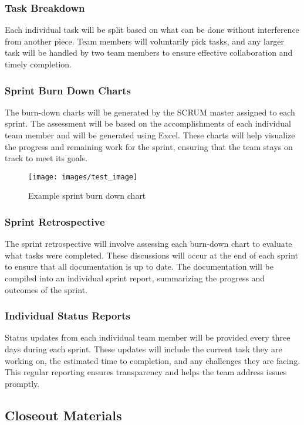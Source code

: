 \subsubsection{Task Breakdown}
Each individual task will be split based on what can be done without interference from another piece. Team members will voluntarily pick tasks, and any larger task will be handled by two team members to ensure effective collaboration and timely completion.

\subsubsection{Sprint Burn Down Charts}
The burn-down charts will be generated by the SCRUM master assigned to each sprint. The assessment will be based on the accomplishments of each individual team member and will be generated using Excel. These charts will help visualize the progress and remaining work for the sprint, ensuring that the team stays on track to meet its goals. 

\begin{figure}[h!]
    \centering
    \texttt{[image: images/test\_image]}
    \caption{Example sprint burn down chart}
\end{figure}

\subsubsection{Sprint Retrospective}
The sprint retrospective will involve assessing each burn-down chart to evaluate what tasks were completed. These discussions will occur at the end of each sprint to ensure that all documentation is up to date. The documentation will be compiled into an individual sprint report, summarizing the progress and outcomes of the sprint.

\subsubsection{Individual Status Reports}
Status updates from each individual team member will be provided every three days during each sprint. These updates will include the current task they are working on, the estimated time to completion, and any challenges they are facing. This regular reporting ensures transparency and helps the team address issues promptly.


\subsection{Closeout Materials}



